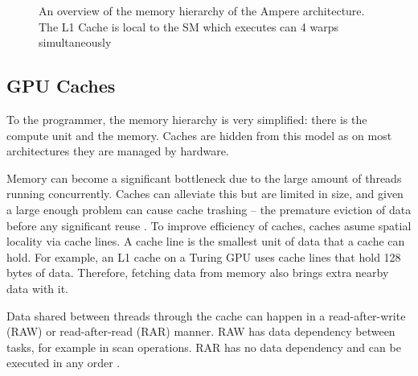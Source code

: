 \begin{figure}[!hb]
    \centering
    \caption{
        An overview of the memory hierarchy of the Ampere architecture. The L1 Cache is local to the SM which executes can 4 warps simultaneously 
    }
\end{figure}

\subsection{GPU Caches}
\label{sec:cache_gpu}
To the programmer, the memory hierarchy is very simplified: there is the compute unit and the memory.
Caches are hidden from this model as on most architectures they are managed by hardware.

Memory can become a significant bottleneck due to the large amount of threads running concurrently.
Caches can alleviate this but are limited in size, and given a large enough problem can cause cache trashing -- the premature eviction of data before any significant reuse \cite{dai2016model}.
To improve efficiency of caches, caches asume spatial locality via cache lines.
A cache line is the smallest unit of data that a cache can hold.
For example, an L1 cache on a Turing GPU uses cache lines that hold 128 bytes of data.
Therefore, fetching data from memory also brings extra nearby data with it.

Data shared between threads through the cache can happen in a read-after-write (RAW) or read-after-read (RAR) manner.
RAW has data dependency between tasks, for example in scan operations.
RAR has no data dependency and can be executed in any order \cite{tripathy2021paver}.

